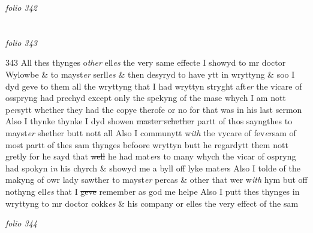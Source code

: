 \documentclass[12pt, a4paper]{book}
\begin{document}
\dotfill
					

\textit{folio 342}


         \vspace{4cm}
         
\dotfill
					  \section*{}

\textit{folio 343}



{\color{Mahogany}343} All thes thynges o\textit{ther} ell\textit{es} the very same effecte I showyd to mr doctor Wylowbe \& to mayst\textit{er} serll\textit{es} \& then desyryd to have ytt in wryttyng \& soo I dyd geve to them all the wryttyng that I  had wryttyn stryght aft\textit{er} the vicare of osspryng had prechyd except only the spekyng of the mase whych I am nott p\textit{er}sytt whether they had the  copye therofe or no for that was in his last sermon Also I thynke thynke I dyd showen \sout{master schether} partt of thos sayngthes to mayst\textit{er} shether butt nott all  Also I communytt w\textit{ith}
			the vycare of fev\textit{er}sam of most  partt of thes sam thynges befoore wryttyn butt he regardytt them nott gretly for he sayd that \sout{well }he had mat\textit{er}s to many whych the  vicar of ospryng had spokyn i\textit{n}
               his 
			chyrch \& showyd me a byll off lyke mat\textit{er}s  Also I tolde of the makyng of owr lady sawther to mayst\textit{er} percas \& other that wer w\textit{ith} hym but  off nothyng 
			ell\textit{es} that I \sout{geve }remember as god me helpe  Also I putt thes thynges in wryttyng to mr doctor cokk\textit{es} \& his company or elles the 
			very effect of  the sam

\dotfill
					

\textit{folio 344}
\end{document}
